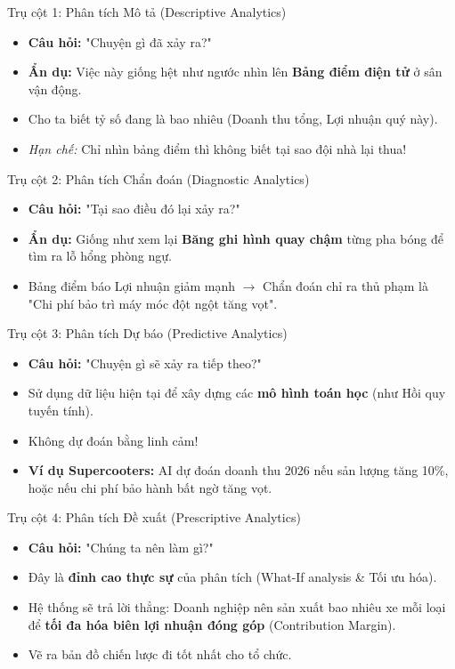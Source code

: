 \documentclass[aspectratio=169,12pt]{beamer}
\begin{document}
\begin{frame}{Trụ cột 1: Phân tích Mô tả (Descriptive Analytics)}
    \begin{itemize}
        \item \textbf{Câu hỏi:} "Chuyện gì đã xảy ra?"
        \item \textbf{Ẩn dụ:} Việc này giống hệt như ngước nhìn lên \textbf{Bảng điểm điện tử} ở sân vận động.
        \item Cho ta biết tỷ số đang là bao nhiêu (Doanh thu tổng, Lợi nhuận quý này).
        \item \textit{Hạn chế:} Chỉ nhìn bảng điểm thì không biết tại sao đội nhà lại thua!
    \end{itemize}
\end{frame}

\begin{frame}{Trụ cột 2: Phân tích Chẩn đoán (Diagnostic Analytics)}
    \begin{itemize}
        \item \textbf{Câu hỏi:} "Tại sao điều đó lại xảy ra?"
        \item \textbf{Ẩn dụ:} Giống như xem lại \textbf{Băng ghi hình quay chậm} từng pha bóng để tìm ra lỗ hổng phòng ngự.
        \item Bảng điểm báo Lợi nhuận giảm mạnh $\rightarrow$ Chẩn đoán chỉ ra thủ phạm là "Chi phí bảo trì máy móc đột ngột tăng vọt".
    \end{itemize}
\end{frame}

\begin{frame}{Trụ cột 3: Phân tích Dự báo (Predictive Analytics)}
    \begin{itemize}
        \item \textbf{Câu hỏi:} "Chuyện gì sẽ xảy ra tiếp theo?"
        \item Sử dụng dữ liệu hiện tại để xây dựng các \textbf{mô hình toán học} (như Hồi quy tuyến tính).
        \item Không dự đoán bằng linh cảm!
        \item \textbf{Ví dụ Supercooters:} AI dự đoán doanh thu 2026 nếu sản lượng tăng 10\%, hoặc nếu chi phí bảo hành bất ngờ tăng vọt.
    \end{itemize}
\end{frame}

\begin{frame}{Trụ cột 4: Phân tích Đề xuất (Prescriptive Analytics)}
    \begin{itemize}
        \item \textbf{Câu hỏi:} "Chúng ta nên làm gì?"
        \item Đây là \textbf{đỉnh cao thực sự} của phân tích (What-If analysis \& Tối ưu hóa).
        \item Hệ thống sẽ trả lời thẳng: Doanh nghiệp nên sản xuất bao nhiêu xe mỗi loại để \textbf{tối đa hóa biên lợi nhuận đóng góp} (Contribution Margin).
        \item Vẽ ra bản đồ chiến lược đi tốt nhất cho tổ chức.
    \end{itemize}
\end{frame}
\end{document}
